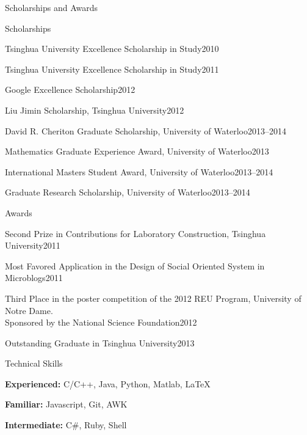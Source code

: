 \documentclass{resume} %
\begin{document}
\begin{rSection}{Scholarships and Awards}
\begin{rSubsection}{Scholarships}{}{}{}
\item{Tsinghua University Excellence Scholarship in Study\hfill{2010}}
\item{Tsinghua University Excellence Scholarship in Study\hfill{2011}}
\item{Google Excellence Scholarship\hfill{2012}}
\item{Liu Jimin Scholarship, Tsinghua University\hfill{2012}}
\item{David R. Cheriton Graduate Scholarship, University of Waterloo\hfill{2013--2014}}
\item{Mathematics Graduate Experience Award, University of Waterloo\hfill{2013}}
\item{International Masters Student Award, University of Waterloo\hfill{2013--2014}}
\item{Graduate Research Scholarship, University of Waterloo\hfill{2013--2014}}
\end{rSubsection}
\begin{rSubsection}{Awards}{}{}{}
\item{Second Prize in Contributions for Laboratory Construction, Tsinghua University\hfill{2011}}
\item{Most Favored Application in the Design of Social Oriented System in Microblogs\hfill{2011}}
\item{Third Place in the poster competition of the 2012 REU Program, University of Notre Dame.\\ Sponsored by the National Science Foundation\hfill{2012}}
\item{Outstanding Graduate in Tsinghua University\hfill{2013}}
\end{rSubsection}
\end{rSection}



\begin{rSection}{Technical Skills}
\item{}\textbf{Experienced: }C/C++, Java, Python, Matlab, LaTeX
\item{}\textbf{Familiar: }Javascript, Git, AWK
\item{}\textbf{Intermediate: }C\#, Ruby, Shell
\end{rSection}
\end{document}
